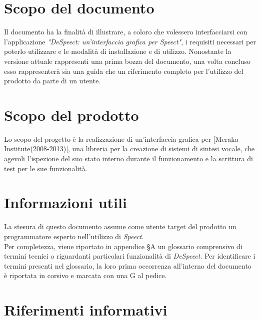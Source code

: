 \documentclass[openany,12pt,a4paper]{report}
\begin{document}
	\section{Scopo del documento}
	
	Il documento ha la finalità di illustrare, a coloro che volessero interfacciarsi con l’applicazione
	\textit{"DeSpeect: un'interfaccia grafica per Speect"}, i requisiti necessari per poterlo utilizzare e le modalità di installazione e di utilizzo. 
	Nonostante la versione attuale rappresenti una prima bozza del documento, una volta concluso esso rappresenterà sia una guida che un riferimento completo per l’utilizzo del prodotto da parte di un utente.
	
	\section{Scopo del prodotto}
	
	Lo scopo del progetto è la realizzazione di un’interfaccia grafica per  [Meraka Institute(2008-2013)], una libreria per la creazione di sistemi di sintesi vocale, che agevoli l’ispezione del suo stato interno durante il funzionamento e la scrittura di test per le sue funzionalità.
	
	\section{Informazioni utili}
	
	La stesura di questo documento assume come utente target del prodotto un programmatore esperto nell'utilizzo di \textit{Speect}. \\
	\noindent Per completezza, viene riportato in appendice §A un glossario comprensivo di termini tecnici o riguardanti particolari funzionalità di \textit{DeSpeect}. Per identificare i termini presenti nel glossario, la loro prima occorrenza all’interno del documento è riportata in corsivo e marcata con una G al pedice. 
	

	\newpage
	
	\section{Riferimenti informativi}
\end{document}
